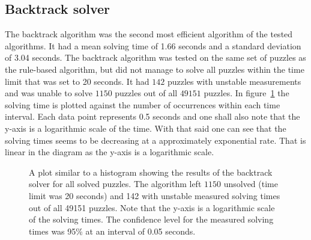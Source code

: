 \documentclass[a4paper,11pt]{kth-mag}
\begin{document}
\subsection{Backtrack solver}
\label{sec:backtrack}
The backtrack algorithm was the second most efficient algorithm of the tested algorithms.
It had a mean solving time of 1.66 seconds and a standard deviation of 3.04 seconds.
The backtrack algorithm was tested on the same set of puzzles as the rule-based algorithm, but did not manage to solve all puzzles within the time limit that was set to 20 seconds.
It had $142$ puzzles with unstable measurements and was unable to solve $1150$ puzzles out of all $49151$ puzzles.
In figure~\ref{fig:backtrackDistribution} the solving time is plotted against the number of occurrences within each time interval.
Each data point represents 0.5 seconds and one shall also note that the y-axis is a logarithmic scale of the time.
With that said one can see that the solving times seems to be decreasing at a approximately exponential rate.
That is linear in the diagram as the y-axis is a logarithmic scale.

\begin{figure}[here] 
\noindent{}
\vspace{-15pt}
\caption[Plot of backtrack results]{A plot similar to a histogram showing the results of the backtrack solver for all solved puzzles. The algorithm left $1150$ unsolved (time limit was 20 seconds) and 142 with unstable measured solving times out of all 49151 puzzles. Note that the y-axis is a logarithmic scale of the solving times. The confidence level for the measured solving times was 95\% at an interval of 0.05 seconds.}
\label{fig:backtrackDistribution}
\end{figure}
\end{document}
